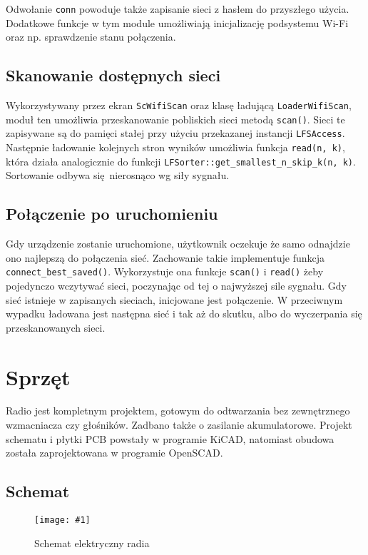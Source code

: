 \documentclass[polish]{aghengthesis}
\newcommand{\imgint}[4]{
	\begin{figure}[{#4}]
		\centering
		\texttt{[image: \#1]}
		\caption{#2}
		\label{#1}
	\end{figure}
}
\newcommand{\imgh}[3]{\imgint{#1}{#2}{#3}{H}}
\begin{document}
			Odwołanie \lstinline|conn| powoduje także zapisanie sieci z hasłem do przyszłego użycia. Dodatkowe funkcje w tym module umożliwiają inicjalizację podsystemu Wi-Fi oraz np. sprawdzenie stanu połączenia.
			
		\subsection{Skanowanie dostępnych sieci}
			Wykorzystywany przez ekran \lstinline|ScWifiScan| oraz klasę ładującą \lstinline|LoaderWifiScan|, moduł ten umożliwia przeskanowanie pobliskich sieci metodą \lstinline|scan()|. Sieci te zapisywane są do pamięci stałej przy użyciu przekazanej instancji \lstinline|LFSAccess|. Następnie ładowanie kolejnych stron wyników umożliwia funkcja \lstinline|read(n, k)|, która działa analogicznie do funkcji \lstinline|LFSorter::get_smallest_n_skip_k(n, k)|. Sortowanie odbywa się nierosnąco wg siły sygnału.
			
		\subsection{Połączenie po uruchomieniu}
			Gdy urządzenie zostanie uruchomione, użytkownik oczekuje że samo odnajdzie ono najlepszą do połączenia sieć. Zachowanie takie implementuje funkcja \lstinline|connect_best_saved()|. Wykorzystuje ona funkcje \lstinline|scan()| i \lstinline|read()| żeby pojedynczo wczytywać sieci, poczynając od tej o najwyższej sile sygnału. Gdy sieć istnieje w zapisanych sieciach, inicjowane jest połączenie. W przeciwnym wypadku ładowana jest następna sieć i tak aż do skutku, albo do wyczerpania się przeskanowanych sieci.
		
	\section{Sprzęt}
		\label{sec:hw}
		Radio jest kompletnym projektem, gotowym do odtwarzania bez zewnętrznego wzmacniacza czy głośników. Zadbano także o zasilanie akumulatorowe. Projekt schematu i płytki PCB powstały w programie KiCAD\textsuperscript{\cite{hw_kicad}}, natomiast obudowa została zaprojektowana w programie OpenSCAD\textsuperscript{\cite{hw_openscad}}.
	
		\subsection{Schemat}
			\imgh{3/hw_kicad_sch}{Schemat elektryczny radia}{1}
			
\end{document}
